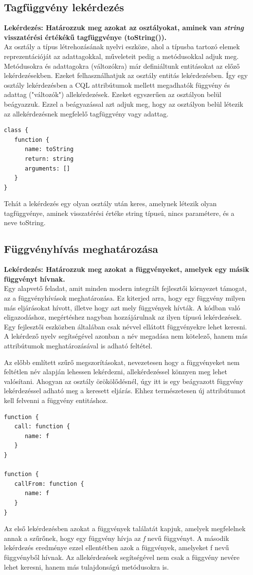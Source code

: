 \documentclass[a4paper,12pt]{report}
\begin{document}
\subsection{Tagfüggvény lekérdezés}
\textbf{Lekérdezés: Határozzuk meg azokat az osztályokat, aminek van \textit{string} visszatérési értékékű tagfüggvénye (toString()).}
\\
Az osztály a típus létrehozásának nyelvi eszköze, ahol a típusba tartozó elemek reprezentációját az adattagokkal, műveleteit pedig a metódusokkal adjuk meg. Metódusokra és adattagokra (változókra) már definiáltunk entitásokat az előző lekérdezésekben. Ezeket felhasználhatjuk az osztály entitás lekérdezésben. Így egy osztály lekérdezésben a CQL attribútumok mellett megadhatók függvény és adattag ("változók") allekérdezések. Ezeket egyszerűen az osztályon belül beágyazzuk. Ezzel a beágyazással azt adjuk meg, hogy az osztályon belül létezik az allekérdezésnek megfelelő tagfüggvény vagy adattag.
\begin{verbatim}
class {
   function {
      name: toString
      return: string
      arguments: []
   }
}
\end{verbatim}
Tehát a lekérdezés egy olyan osztály után keres, amelynek létezik olyan tagfüggvénye, aminek visszatérési értéke string típusú, nincs paramétere, és a neve toString.
\subsection{Függvényhívás meghatározása}
\textbf{Lekérdezés: Határozzuk meg azokat a függvényeket, amelyek egy másik függvényt hívnak.}
\\
Egy alapvető feladat, amit minden modern integrált fejlesztői környezet támogat, az a függvényhívások meghatározása. Ez kiterjed arra, hogy egy függvény milyen más eljárásokat hívott, illetve hogy azt mely függvények hívták. A kódban való eligazodáshoz, megértéshez nagyban hozzájárulnak az ilyen típusú lekérdezések. Egy fejlesztői eszközben általában csak névvel ellátott függvényekre lehet keresni. A lekérdező nyelv segítségével azonban a név megadása nem kötelező, hanem más attribútumok meghatározásával is adható feltétel.
\par  Az előbb említett szűrő megszorításokat, nevezetesen hogy a függvényeket nem feltétlen név alapján lehessen lekérdezni, allekérdezéssel könnyen meg lehet valósítani. Ahogyan az osztály örökölődésnél, úgy itt is egy beágyazott függvény lekérdezéssel adható meg a keresett eljárás. Ehhez természetesen új attribútumot kell felvenni a függvény entitáshoz.
\begin{verbatim}
function {
   call: function { 
      name: f 
   }
}

function {
   callFrom: function { 
      name: f 
   }
}
\end{verbatim}
\par Az első lekérdezésben azokat a függvények találatát kapjuk, amelyek megfelelnek annak a szűrőnek, hogy egy függvény hívja az \textit{f} nevű függvényt. A második lekérdezés eredménye ezzel ellentétben azok a függvények, amelyeket f nevű függvényből hívnak. Az allekérdezések segítségével nem csak a függvény nevére lehet keresni, hanem más tulajdonságú metódusokra is.
\end{document}

